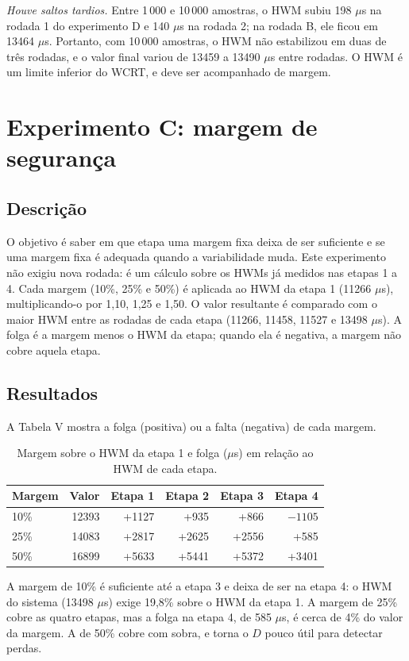 \documentclass[conference,a4paper]{IEEEtran}
\begin{document}
\emph{Houve saltos tardios.} Entre 1\,000 e 10\,000 amostras, o HWM subiu 198 $\mu$s na rodada 1 do experimento D e 140 $\mu$s na rodada 2; na rodada B, ele ficou em 13464 $\mu$s. Portanto, com 10\,000 amostras, o HWM não estabilizou em duas de três rodadas, e o valor final variou de 13459 a 13490 $\mu$s entre rodadas. O HWM é um limite inferior do WCRT, e deve ser acompanhado de margem.

\section{Experimento C: margem de segurança}
\subsection{Descrição}
O objetivo é saber em que etapa uma margem fixa deixa de ser suficiente e se uma margem fixa é adequada quando a variabilidade muda. Este experimento não exigiu nova rodada: é um cálculo sobre os HWMs já medidos nas etapas 1 a 4. Cada margem (10\%, 25\% e 50\%) é aplicada ao HWM da etapa 1 (11266 $\mu$s), multiplicando-o por 1,10, 1,25 e 1,50. O valor resultante é comparado com o maior HWM entre as rodadas de cada etapa (11266, 11458, 11527 e 13498 $\mu$s). A folga é a margem menos o HWM da etapa; quando ela é negativa, a margem não cobre aquela etapa.

\subsection{Resultados}
A Tabela V mostra a folga (positiva) ou a falta (negativa) de cada margem.

\begin{table}[!t]
\centering
\caption{Margem sobre o HWM da etapa 1 e folga ($\mu$s) em relação ao HWM de cada etapa.}
\small
\setlength{\tabcolsep}{3pt}
\begin{tabular}{lrrrrr}
\toprule
Margem & Valor & Etapa 1 & Etapa 2 & Etapa 3 & Etapa 4 \\
\midrule
10\% & 12393 & +1127 & +935 & +866 & $-1105$ \\
25\% & 14083 & +2817 & +2625 & +2556 & +585 \\
50\% & 16899 & +5633 & +5441 & +5372 & +3401 \\
\bottomrule
\end{tabular}
\end{table}

A margem de 10\% é suficiente até a etapa 3 e deixa de ser na etapa 4: o HWM do sistema (13498 $\mu$s) exige 19,8\% sobre o HWM da etapa 1. A margem de 25\% cobre as quatro etapas, mas a folga na etapa 4, de 585 $\mu$s, é cerca de 4\% do valor da margem. A de 50\% cobre com sobra, e torna o $D$ pouco útil para detectar perdas.
\end{document}
